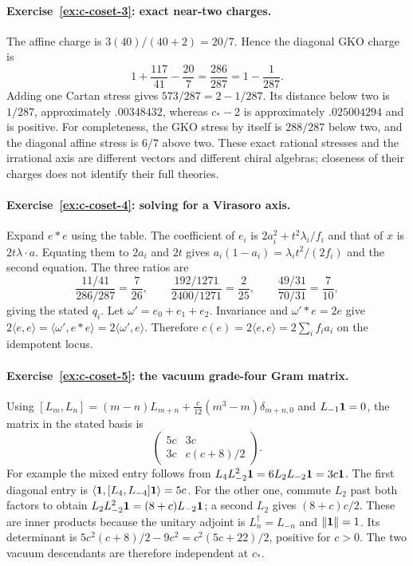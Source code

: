 \paragraph{Exercise~\ref{ex:c-coset-3}: exact near-two charges.}
\label{sol:ex:c-coset-3}
The affine charge is $3(40)/(40+2)=20/7$. Hence the diagonal
GKO charge is
\[
 1+\frac{117}{41}-\frac{20}{7}
 =\frac{286}{287}=1-\frac1{287}.
\]
Adding one Cartan stress gives $573/287=2-1/287$.
Its distance below two is $1/287$, approximately $.00348432$,
whereas $c_*-2$ is approximately $.025004294$ and is positive.
For completeness, the GKO stress by itself is $288/287$ below
two, and the diagonal affine stress is $6/7$ above two.
These exact rational stresses and the irrational axis are different
vectors and different chiral algebras; closeness of their charges
does not identify their full theories.



\paragraph{Exercise~\ref{ex:c-coset-4}: solving for a Virasoro axis.}
\label{sol:ex:c-coset-4}
Expand $e*e$ using the table. The coefficient of $e_i$ is
$2a_i^2+t^2\lambda_i/f_i$ and that of $x$ is
$2t\lambda\cdot a$. Equating them to $2a_i$ and $2t$ gives
$a_i(1-a_i)=\lambda_i t^2/(2f_i)$ and the second equation.
The three ratios are
\[
 \frac{11/41}{286/287}=\frac7{26},\qquad
 \frac{192/1271}{2400/1271}=\frac2{25},\qquad
 \frac{49/31}{70/31}=\frac7{10},
\]
giving the stated $q_i$.
Let $\omega'=e_0+e_1+e_2$. Invariance and $\omega'*e=2e$
give
$2\langle e,e\rangle=\langle\omega',e*e\rangle
=2\langle\omega',e\rangle$. Therefore
$c(e)=2\langle e,e\rangle=2\sum_i f_i a_i$ on the
idempotent locus.



\paragraph{Exercise~\ref{ex:c-coset-5}: the vacuum grade-four Gram matrix.}
\label{sol:ex:c-coset-5}
Using $[L_m,L_n]=(m-n)L_{m+n}+\frac c{12}(m^3-m)\delta_{m+n,0}$
and $L_{-1}\mathbf1=0$, the matrix in the stated basis is
\[
 \begin{pmatrix}5c&3c\\3c&c(c+8)/2\end{pmatrix}.
\]
For example the mixed entry follows from
$L_4L_{-2}^2\mathbf1=6L_2L_{-2}\mathbf1=3c\mathbf1$.
The first diagonal entry is
$\langle\mathbf1,[L_4,L_{-4}]\mathbf1\rangle=5c$.
For the other one, commute $L_2$ past both factors to obtain
$L_2L_{-2}^2\mathbf1=(8+c)L_{-2}\mathbf1$; a second $L_2$ gives
$(8+c)c/2$. These are inner products because the unitary
adjoint is $L_n^\dagger=L_{-n}$ and $\|\mathbf1\|=1$.
Its determinant is
$5c^2(c+8)/2-9c^2=c^2(5c+22)/2$, positive for $c>0$.
The two vacuum descendants are therefore independent at $c_*$.



